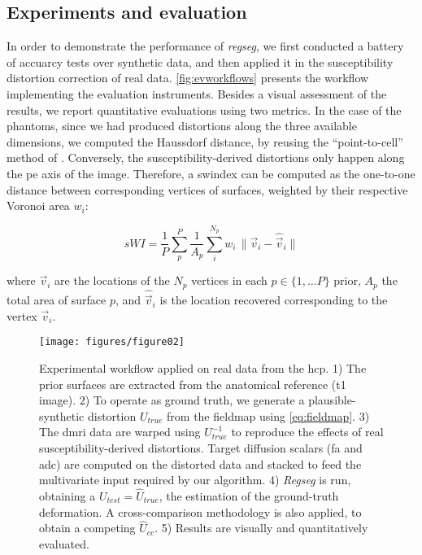 \subsection{Experiments and evaluation}
\label{sec:experiments_evaluation}
%
In order to demonstrate the performance of \emph{regseg}, we first conducted a battery of
  accuarcy tests over synthetic data, and then applied it in the susceptibility distortion
  correction of real data.
\autoref{fig:evworkflows} presents the workflow implementing the evaluation instruments.
Besides a visual assessment of the results, we report quantitative evaluations using
  two metrics.
In the case of the phantoms, since we had produced distortions along the three
  available dimensions, we computed the Haussdorf distance, by reusing the
  ``point-to-cell'' method of \cite{commandeur_vtk_2011}.
Conversely, the susceptibility-derived distortions only happen along the \gls*{pe}
  axis of the image.
Therefore, a \gls*{swindex} can be computed as the one-to-one distance between corresponding
  vertices of surfaces, weighted by their respective Voronoi area $w_i$:

  \begin{equation}
  sWI = \frac{1}{P} \sum\limits_p^P \frac{1}{A_p} \sum\limits_i^{N_p} w_i\,\|
  \vec{v}_i - \hat{\vec{v}}_i \|
  \label{eq:swindex}
  \end{equation}

  where $\vec{v}_i$ are the locations of the $N_p$ vertices in each $p \in \{1, \dots P\}$
  prior, $A_p$ the total area of surface $p$, and $\hat{\vec{v}}_i$ is the location
  recovered corresponding to the vertex $\vec{v}_i$.


\begin{figure*}
\texttt{[image: figures/figure02]}
\caption{Experimental workflow applied on real data from the \acrfull*{hcp}.
  1) The prior surfaces are extracted from the anatomical reference (\gls*{t1} image).
	2) To operate as ground truth, we generate a plausible-synthetic distortion $U_{true}$
	  from the fieldmap using \eqref{eq:fieldmap}.
	3) The \gls*{dmri} data are warped using $U^{-1}_{true}$ to reproduce the effects of real
	  susceptibility-derived distortions.
	Target diffusion scalars (\gls*{fa} and \gls*{adc}) are computed on the distorted data and
		stacked to feed the multivariate input required by our algorithm.
	4) \emph{Regseg} is run, obtaining a $U_{test} = \hat{U}_{true}$, the estimation of
	  the ground-truth deformation.
	  A cross-comparison methodology is also applied, to obtain a competing $\hat{U}_{cc}$.
	5) Results are visually and quantitatively evaluated.}\label{fig:evworkflows}
\end{figure*}


